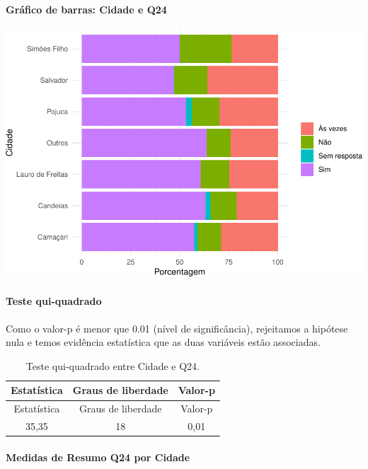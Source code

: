 \documentclass[]{article}
\let\oldparagraph\paragraph
\renewcommand{\paragraph}[1]{\oldparagraph{#1}\mbox{}}
\begin{document}
\hypertarget{gruxe1fico-de-barras-cidade-e-q24}{%
\paragraph{Gráfico de barras: Cidade e Q24}\label{gruxe1fico-de-barras-cidade-e-q24}}

\begin{center}\includegraphics[width=0.75\linewidth]{relatorio_covid19_files/figure-latex/unnamed-chunk-604-1} \end{center}

\hypertarget{teste-qui-quadrado-52}{%
\paragraph{Teste qui-quadrado}\label{teste-qui-quadrado-52}}

Como o valor-p é menor que 0.01 (nível de significância), rejeitamos a hipótese nula e temos evidência estatística que as duas variáveis estão associadas.

\begin{longtable}[]{@{}ccc@{}}
\caption{\label{tab:unnamed-chunk-606}Teste qui-quadrado entre Cidade e Q24.}\tabularnewline
\toprule
Estatística & Graus de liberdade & Valor-p\tabularnewline
\midrule
\endfirsthead
\toprule
Estatística & Graus de liberdade & Valor-p\tabularnewline
\midrule
\endhead
35,35 & 18 & 0,01\tabularnewline
\bottomrule
\end{longtable}

\cleardoublepage

\hypertarget{medidas-de-resumo-q24-por-cidade}{%
\paragraph{Medidas de Resumo Q24 por Cidade}\label{medidas-de-resumo-q24-por-cidade}}
\end{document}
